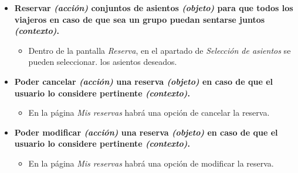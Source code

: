 \begin{itemize}
    \item \textbf{Reservar \textit{(acción)} conjuntos de asientos \textit{(objeto)} para que todos los viajeros en caso de que sea un grupo puedan
        sentarse juntos \textit{(contexto)}.}
        \begin{itemize}
            \item Dentro de la pantalla \textit{Reserva}, en el apartado de \textit{Selección de asientos} se pueden seleccionar.
                los asientos deseados.
        \end{itemize}

    \item \textbf{Poder cancelar \textit{(acción)} una reserva \textit{(objeto)} en caso de que el usuario lo considere pertinente \textit{(contexto)}.}
        \begin{itemize}
            \item En la página \textit{Mis reservas} habrá una opción de cancelar la reserva.
        \end{itemize}

    \item \textbf{Poder modificar \textit{(acción)} una reserva \textit{(objeto)} en caso de que el usuario lo considere pertinente \textit{(contexto)}.}
        \begin{itemize}
            \item En la página \textit{Mis reservas} habrá una opción de modificar la reserva.
        \end{itemize}

\end{itemize}
